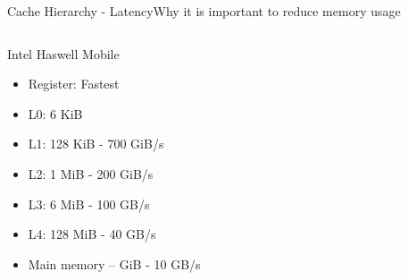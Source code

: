 \documentclass[10pt,aspectratio=169]{beamer}
\begin{document}
\begin{frame}{Cache Hierarchy - Latency}{Why it is important to reduce memory usage}
    \begin{columns}
        \begin{column}{0.4\textwidth}
            Intel Haswell Mobile 
            \begin{itemize}
                \item Register: Fastest
                \item L0: 6 KiB
                \item L1: 128 KiB - 700 GiB/s
                \item L2: 1 MiB - 200 GiB/s
                \item L3: 6 MiB - 100 GB/s
                \item L4: 128 MiB - 40 GB/s
                \item Main memory – GiB - 10 GB/s
            \end{itemize}
        \end{column}

    \end{columns}
\end{frame}
\end{document}
